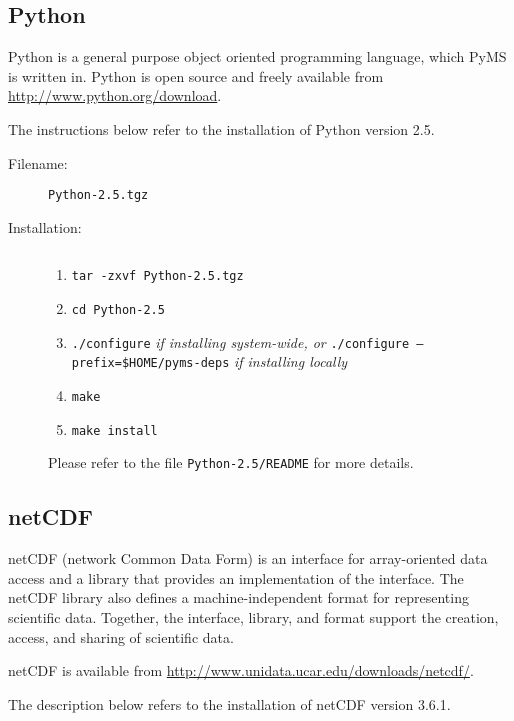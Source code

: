 \subsection{Python}

Python is a general purpose object oriented programming language, which
PyMS is written in.  Python is open source and freely available
from \url{http://www.python.org/download}.

The instructions below refer to the installation of Python version
2.5.

\begin{description}
\item [Filename:] {\tt Python-2.5.tgz}
\item [Installation:] $ $
  \begin{enumerate}
  \item {\tt tar -zxvf Python-2.5.tgz}
  \item {\tt cd Python-2.5}
  \item {\tt ./configure} {\it if installing system-wide, or}\newline
        {\tt ./configure --prefix=\$HOME/pyms-deps} {\it if installing locally}
  \item {\tt make}
  \item {\tt make install}
  \end{enumerate}
Please refer to the file {\tt Python-2.5/README} for more details.
\end{description}

\subsection{netCDF}

netCDF (network Common Data Form) is an interface for array-oriented
data access and a library that provides an implementation of the
interface. The netCDF library also defines a machine-independent
format for representing scientific data. Together, the interface,
library, and format support the creation, access, and sharing of
scientific data.

netCDF is available from \url{http://www.unidata.ucar.edu/downloads/netcdf/}.

The description below refers to the installation of netCDF version
3.6.1.

